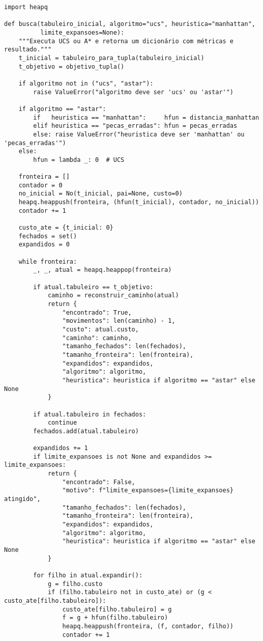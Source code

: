 \begin{verbatim}
import heapq

def busca(tabuleiro_inicial, algoritmo="ucs", heuristica="manhattan",
          limite_expansoes=None):
    """Executa UCS ou A* e retorna um dicionário com métricas e resultado."""
    t_inicial = tabuleiro_para_tupla(tabuleiro_inicial)
    t_objetivo = objetivo_tupla()

    if algoritmo not in ("ucs", "astar"):
        raise ValueError("algoritmo deve ser 'ucs' ou 'astar'")

    if algoritmo == "astar":
        if   heuristica == "manhattan":     hfun = distancia_manhattan
        elif heuristica == "pecas_erradas": hfun = pecas_erradas
        else: raise ValueError("heuristica deve ser 'manhattan' ou 'pecas_erradas'")
    else:
        hfun = lambda _: 0  # UCS

    fronteira = []
    contador = 0
    no_inicial = No(t_inicial, pai=None, custo=0)
    heapq.heappush(fronteira, (hfun(t_inicial), contador, no_inicial))
    contador += 1

    custo_ate = {t_inicial: 0}
    fechados = set()
    expandidos = 0

    while fronteira:
        _, _, atual = heapq.heappop(fronteira)

        if atual.tabuleiro == t_objetivo:
            caminho = reconstruir_caminho(atual)
            return {
                "encontrado": True,
                "movimentos": len(caminho) - 1,
                "custo": atual.custo,
                "caminho": caminho,
                "tamanho_fechados": len(fechados),
                "tamanho_fronteira": len(fronteira),
                "expandidos": expandidos,
                "algoritmo": algoritmo,
                "heuristica": heuristica if algoritmo == "astar" else None
            }

        if atual.tabuleiro in fechados:
            continue
        fechados.add(atual.tabuleiro)

        expandidos += 1
        if limite_expansoes is not None and expandidos >= limite_expansoes:
            return {
                "encontrado": False,
                "motivo": f"limite_expansoes={limite_expansoes} atingido",
                "tamanho_fechados": len(fechados),
                "tamanho_fronteira": len(fronteira),
                "expandidos": expandidos,
                "algoritmo": algoritmo,
                "heuristica": heuristica if algoritmo == "astar" else None
            }

        for filho in atual.expandir():
            g = filho.custo
            if (filho.tabuleiro not in custo_ate) or (g < custo_ate[filho.tabuleiro]):
                custo_ate[filho.tabuleiro] = g
                f = g + hfun(filho.tabuleiro)
                heapq.heappush(fronteira, (f, contador, filho))
                contador += 1
\end{verbatim}

